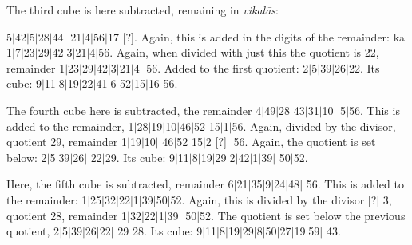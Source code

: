 \documentclass[11pt,a5paper]{book}
\def\vikalas{\textit{vi\-ka\-l\=as}}
\def\danda{$|$}
\begin{document}
{The third cube is here subtracted, remaining in \vikalas: 

5\danda 42\danda 5\danda 28\danda 44\danda
21\danda 4\danda 56\danda 17 [?]. Again, this is added in the digits of the remainder: ka
1\danda 7\danda 23\danda 29\danda 42\danda 3\danda 21\danda 4\danda 56. Again, when divided with
just this the quotient is 22, remainder 1\danda 23\danda 29\danda 42\danda 3\danda 21\danda 4\danda
56.  Added to the first quotient: 2\danda 5\danda 39\danda 26\danda 22. Its cube:
9\danda 11\danda 8\danda 19\danda 22\danda 41\danda 6 52\danda 15\danda 16 56.

The fourth cube here is subtracted, the remainder 4\danda 49\danda 28 43\danda 31\danda 10\danda
5\danda 56. This is added to the remainder, 1\danda 28\danda 19\danda 10\danda 46\danda 52
15\danda 1\danda 56. Again, divided by the divisor, quotient 29, remainder 1\danda 19\danda 10\danda
46\danda 52 15\danda 2 [?] \danda 56. Again, the quotient is set below: 2\danda 5\danda 39\danda 26\danda
22\danda 29. Its cube: 9\danda 11\danda 8\danda 19\danda 29\danda 2\danda 42\danda 1\danda 39\danda
50\danda 52. 

Here, the fifth cube is subtracted, remainder 6\danda 21\danda 35\danda 9\danda 24\danda 48\danda
56. This is added to the remainder: 1\danda 25\danda 32\danda 22\danda 1\danda 39\danda 50\danda 52.
Again, this is divided by the divisor [?] 3, quotient 28, remainder 1\danda 32\danda 22\danda 1\danda 39\danda
50\danda 52. The quotient is set below the previous quotient, 2\danda 5\danda 39\danda 26\danda 22\danda
29 28. Its cube: 9\danda 11\danda 8\danda 19\danda 29\danda 8\danda 50\danda 27\danda 19\danda 59\danda
43. 

}
\end{document}
